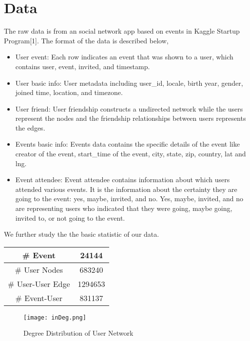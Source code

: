 \documentclass{article}
\begin{document}
\section{Data}
The raw data is from an social network app based on events in Kaggle Startup Program[1]. The format of the data is described below, 
\begin{itemize}
\item User event: Each row indicates an event that was shown to a user, which contains user, event, invited, and timestamp.

\item User basic info: User metadata including user\_id, locale, birth year, gender, joined time, location, and timezone.

\item User friend: User friendship constructs a undirected network while the users represent the nodes and the friendship relationships between users represents the edges. 


\item Events basic info: Events data contains the specific details of the event like creator of the event, start\_time of the event, city, state, zip, country, lat and lng.

\item Event attendee: Event attendee contains information about which users attended various events. It is the information about the certainty they are going to the event: yes, maybe, invited, and no. Yes, maybe, invited, and no are representing users who indicated that they were going, maybe going, invited to, or not going to the event.
\end{itemize}

We further study the the basic statistic of our data.
\begin{center}

\begin{tabular}{|c|c|}
\hline
\# Event&24144 \\ \hline
\# User Nodes&683240\\ \hline
\# User-User Edge&1294653\\ \hline
\# Event-User&831137\\ \hline
\end{tabular}
\end{center}

\begin{figure}[h]
\begin{center}
\texttt{[image: inDeg.png]}
\caption{Degree Distribution of User Network}
\label{fig:degdis}
\end{center}
\end{figure}
\end{document}
